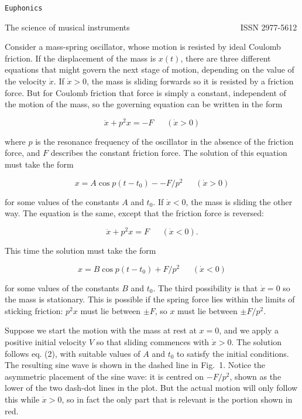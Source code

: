   \tt{}Euphonics\rm{} 

  The science of musical instruments                           ISSN 2977-5612 

  Consider a mass-spring oscillator, whose motion is resisted by ideal Coulomb 
  friction. If the displacement of the mass is $x(t)$, there are three 
  different equations that might govern the next stage of motion, depending on 
  the value of the velocity $\dot{x}$. If $\dot{x}>0$, the mass is sliding 
  forwards so it is resisted by a friction force. But for Coulomb friction that 
  force is simply a constant, independent of the motion of the mass, so the 
  governing equation can be written in the form 

  $$\ddot{x}+p^2 x =-F\mathrm{~~~~~~~}(\dot{x}>0) \tag{1}$$ 

  where $p$ is the resonance frequency of the oscillator in the absence of the 
  friction force, and $F$ describes the constant friction force. The solution 
  of this equation must take the form 

  $$x=A \cos p(t-t_0) -- F/p^2\mathrm{~~~~~~~}(\dot{x}>0) \tag{2}$$ 

  for some values of the constants $A$ and $t_0$. If $\dot{x}<0$, the mass is 
  sliding the other way. The equation is the same, except that the friction 
  force is reversed: 

  $$\ddot{x}+p^2 x =F\mathrm{~~~~~~~}(\dot{x}<0). \tag{3}$$ 

  This time the solution must take the form 

  $$x=B \cos p(t-t_0) + F/p^2\mathrm{~~~~~~~}(\dot{x}<0) \tag{4}$$ 

  for some values of the constants $B$ and $t_0$. The third possibility is that 
  $\dot{x}=0$ so the mass is stationary. This is possible if the spring force 
  lies within the limits of sticking friction: $p^2 x$ must lie between $\pm 
  F$, so $x$ must lie between $\pm F/p^2$. 

  Suppose we start the motion with the mass at rest at $x=0$, and we apply a 
  positive initial velocity $V$ so that sliding commences with $\dot{x}>0$. The 
  solution follows eq. (2), with suitable values of $A$ and $t_0$ to satisfy 
  the initial conditions. The resulting sine wave is shown in the dashed line 
  in Fig.\ 1. Notice the asymmetric placement of the sine wave: it is centred 
  on $-F/p^2$, shown as the lower of the two dash-dot lines in the plot. But 
  the actual motion will only follow this while $\dot{x}>0$, so in fact the 
  only part that is relevant is the portion shown in red. 

